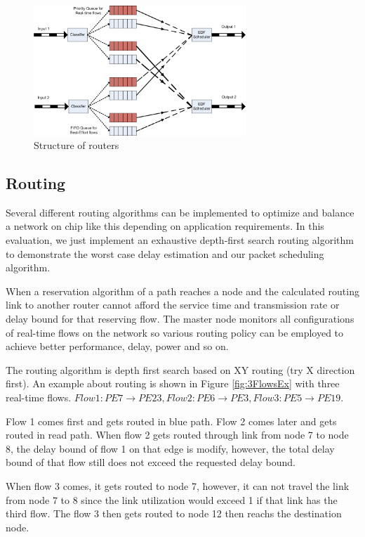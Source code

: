 \documentclass[conference, twocolumn]{IEEEtran}
\theoremstyle{definition}
\begin{document}
\begin{figure}[htp]
\centering
\includegraphics[width=8cm]{pics/Router.png}
\caption[Other Spec.]
{Structure of routers}\label{fig:RouterStructure}
\end{figure}

\subsection{Routing}

Several different routing algorithms can be implemented to optimize and balance
a network on chip like this depending on application requirements. In this
evaluation, we just implement an exhaustive depth-first search routing algorithm
to demonstrate the worst case delay estimation and our packet scheduling algorithm.

When a reservation algorithm of a path reaches a node and the calculated routing
link to another router cannot afford the service time and transmission rate or delay 
bound for that reserving flow. The master node monitors all configurations of
real-time flows on the network so various routing policy can be employed to
achieve better performance, delay, power and so on.

The routing algorithm is depth first search based on XY routing (try X
direction first). An example about routing is shown in Figure
\ref{fig:3FlowsEx} with three real-time flows. $Flow 1: PE7 \rightarrow
PE23, Flow 2: PE6 \rightarrow PE3, Flow 3: PE5 \rightarrow PE19$.

Flow 1 comes first and gets routed in blue path. Flow 2 comes later and gets
routed in read path.  When flow 2 gets routed through link from node 7 to node
8, the delay bound of flow 1 on that edge is modify, however, the total delay
bound of that flow still does not exceed the requested delay bound.

When flow 3 comes, it gets routed to node 7, however, it can not travel the
link from node 7 to 8 since the link utilization would exceed 1 if that link
has the third flow. The flow 3 then gets routed to node 12 then reachs the
destination node.
\end{document}

